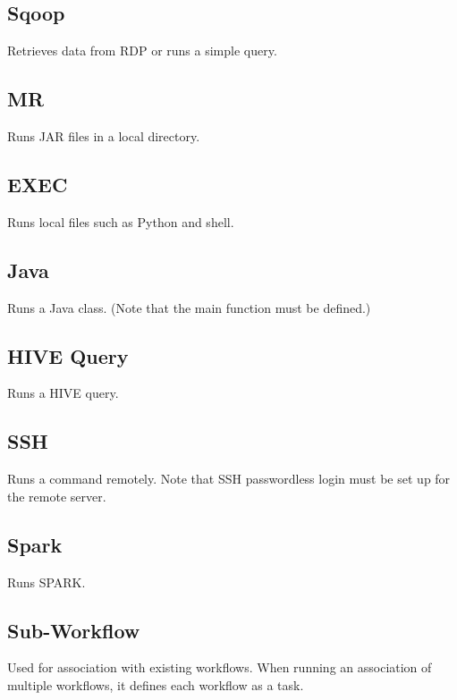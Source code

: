 \documentclass[letterpaper,10pt,english]{sphinxmanual}
\begin{document}
\subsection{Sqoop}
\label{\detokenize{integrator/part03/tasks:sqoop}}
Retrieves data from RDP or runs a simple query.


\subsection{MR}
\label{\detokenize{integrator/part03/tasks:mr}}
Runs JAR files in a local directory.


\subsection{EXEC}
\label{\detokenize{integrator/part03/tasks:exec}}
Runs local files such as Python and shell.


\subsection{Java}
\label{\detokenize{integrator/part03/tasks:java}}
Runs a Java class. (Note that the main function must be defined.)


\subsection{HIVE Query}
\label{\detokenize{integrator/part03/tasks:hive-query}}
Runs a HIVE query.


\subsection{SSH}
\label{\detokenize{integrator/part03/tasks:ssh}}
Runs a command remotely. Note that SSH passwordless login must be set up for the remote server.


\subsection{Spark}
\label{\detokenize{integrator/part03/tasks:spark}}
Runs SPARK.


\subsection{Sub-Workflow}
\label{\detokenize{integrator/part03/tasks:sub-workflow}}
Used for association with existing workflows. When running an association of multiple workflows, it defines each workflow as a task.
\end{document}

